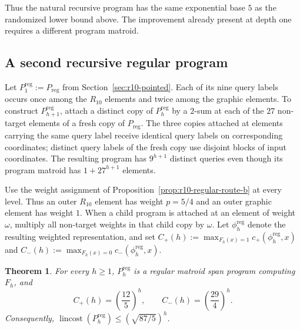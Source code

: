 \documentclass[11pt]{article}
\numberwithin{equation}{section}
\newtheorem{theorem}[definition]{Theorem}
\theoremstyle{remark}
\begin{document}
Thus the natural recursive program has the same exponential base $5$ as the
randomized lower bound above.  The improvement already present at depth one
requires a different program matroid.

\subsection{A second recursive regular program}

Let $P_1^{\mathrm{reg}}:=P_{\mathrm{reg}}$ from
Section~\ref{sec:r10-pointed}.  Each of its nine query labels occurs once among the $R_{10}$ elements and
twice among the graphic elements.  To construct $P_{h+1}^{\mathrm{reg}}$,
attach a distinct copy of $P_h^{\mathrm{reg}}$ by a $2$-sum at each of the
$27$ non-target elements of a fresh copy of $P_{\mathrm{reg}}$.  The three copies attached at elements carrying the same query label receive
identical query labels on corresponding coordinates; distinct query labels of
the fresh copy use disjoint blocks of input coordinates. The resulting
program has $9^{h+1}$ distinct queries even though its program matroid has
$1+27^{h+1}$ elements.

Use the weight assignment of Proposition~\ref{prop:r10-regular-route-b} at
every level.  Thus an outer $R_{10}$ element has weight $p=5/4$ and an outer
graphic element has weight $1$.  When a child program is attached at an element of weight $\omega$, multiply
all non-target weights in that child copy by $\omega$.  Let $\phi_h^{\mathrm{reg}}$ denote the resulting weighted representation, and
set $C_+(h):=\max_{F_h(x)=1}c_+(\phi_h^{\mathrm{reg}},x)$ and
$C_-(h):=\max_{F_h(x)=0}c_-(\phi_h^{\mathrm{reg}},x)$.

\begin{theorem}
\label{thm:recursive-r10-regular-cost}
For every $h\geq1$, $P_h^{\mathrm{reg}}$ is a regular matroid span program
computing $F_h$, and
\begin{equation}
    C_+(h)=\left(\frac{12}{5}\right)^h,
    \qquad
    C_-(h)=\left(\frac{29}{4}\right)^h.
\end{equation}
Consequently,
$\operatorname{lincost}(P_h^{\mathrm{reg}})\leq(\sqrt{87/5})^h$.
\end{theorem}
\end{document}
